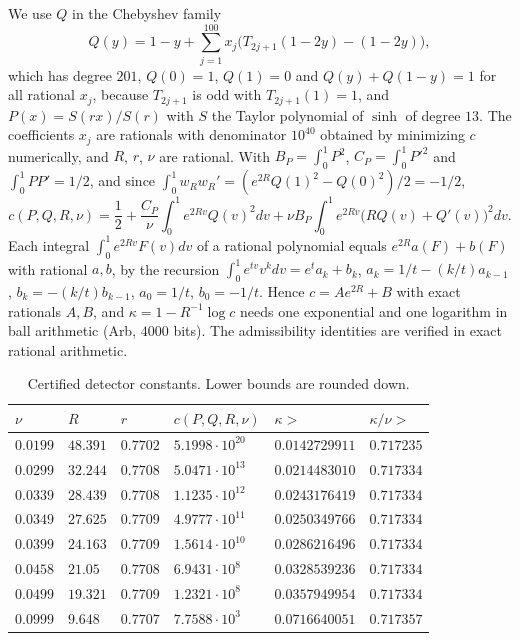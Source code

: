 \documentclass[11pt]{article}
\theoremstyle{remark}
\begin{document}
We use $Q$ in the Chebyshev family
\[
 Q(y)=1-y+\sum_{j=1}^{100}x_j\bigl(T_{2j+1}(1-2y)-(1-2y)\bigr),
\]
which has degree $201$, $Q(0)=1$, $Q(1)=0$ and $Q(y)+Q(1-y)=1$ for all rational
$x_j$, because $T_{2j+1}$ is odd with $T_{2j+1}(1)=1$,
and $P(x)=S(rx)/S(r)$ with $S$ the Taylor polynomial of $\sinh$ of degree
$13$. The coefficients $x_j$ are rationals with denominator $10^{40}$ obtained
by minimizing $c$ numerically, and $R$, $r$, $\nu$ are rational. With
$B_P=\int_0^1P^2$, $C_P=\int_0^1P'^2$ and $\int_0^1PP'=1/2$, and since
$\int_0^1w_Rw_R'=(e^{2R}Q(1)^2-Q(0)^2)/2=-1/2$,
\[
 c(P,Q,R,\nu)=\frac12+\frac{C_P}\nu\int_0^1e^{2Rv}Q(v)^2dv
 +\nu B_P\int_0^1e^{2Rv}\bigl(RQ(v)+Q'(v)\bigr)^2dv .
\]
Each integral $\int_0^1e^{2Rv}F(v)dv$ of a rational polynomial equals
$e^{2R}a(F)+b(F)$ with rational $a,b$, by the recursion
$\int_0^1e^{tv}v^kdv=e^ta_k+b_k$, $a_k=1/t-(k/t)a_{k-1}$,
$b_k=-(k/t)b_{k-1}$, $a_0=1/t$, $b_0=-1/t$. Hence $c=Ae^{2R}+B$ with exact
rationals $A,B$, and $\kappa=1-R^{-1}\log c$ needs one exponential and one
logarithm in ball arithmetic (Arb, $4000$ bits). The admissibility identities
are verified in exact rational arithmetic.

\begin{table}[ht]
\centering
\caption{Certified detector constants. Lower bounds are rounded down.}
\label{tab:kappa}
\begin{tabular}{llllll}
\toprule
$\nu$ & $R$ & $r$ & $c(P,Q,R,\nu)$ & $\kappa>$ & $\kappa/\nu>$\\
\midrule
$0.0199$ & $48.391$ & $0.7702$ & $5.1998\cdot10^{20}$ & $0.0142729911$ & $0.717235$\\
$0.0299$ & $32.244$ & $0.7708$ & $5.0471\cdot10^{13}$ & $0.0214483010$ & $0.717334$\\
$0.0339$ & $28.439$ & $0.7708$ & $1.1235\cdot10^{12}$ & $0.0243176419$ & $0.717334$\\
$0.0349$ & $27.625$ & $0.7709$ & $4.9777\cdot10^{11}$ & $0.0250349766$ & $0.717334$\\
$0.0399$ & $24.163$ & $0.7709$ & $1.5614\cdot10^{10}$ & $0.0286216496$ & $0.717334$\\
$0.0458$ & $21.05$ & $0.7708$ & $6.9431\cdot10^{8}$ & $0.0328539236$ & $0.717334$\\
$0.0499$ & $19.321$ & $0.7709$ & $1.2321\cdot10^{8}$ & $0.0357949954$ & $0.717334$\\
$0.0999$ & $9.648$ & $0.7707$ & $7.7588\cdot10^{3}$ & $0.0716640051$ & $0.717357$\\
\bottomrule
\end{tabular}
\end{table}
\end{document}
